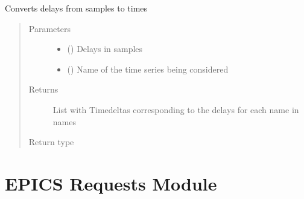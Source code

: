 \documentclass[letterpaper,10pt,english]{sphinxmanual}
\begin{document}
\begin{fulllineitems}
\begin{fulllineitems}
\label{\detokenize{dataset:dataset.Dataset.to_date}}
\sphinxAtStartPar
Converts delays from samples to times
\begin{quote}\begin{description}
\item[{Parameters}] \leavevmode\begin{itemize}
\item {} 
\sphinxAtStartPar
{} () \textendash{} Delays in samples

\item {} 
\sphinxAtStartPar
{} () \textendash{} Name of the time series being considered

\end{itemize}

\item[{Returns}] \leavevmode
\sphinxAtStartPar
List with Timedeltas corresponding to the delays for each name in names

\item[{Return type}] \leavevmode
\sphinxAtStartPar
{}

\end{description}\end{quote}

\end{fulllineitems}


\end{fulllineitems}



\chapter{EPICS Requests Module}
\label{\detokenize{epics_requests:module-epics_requests}}\label{\detokenize{epics_requests:epics-requests-module}}\label{\detokenize{epics_requests::doc}}
\end{document}
